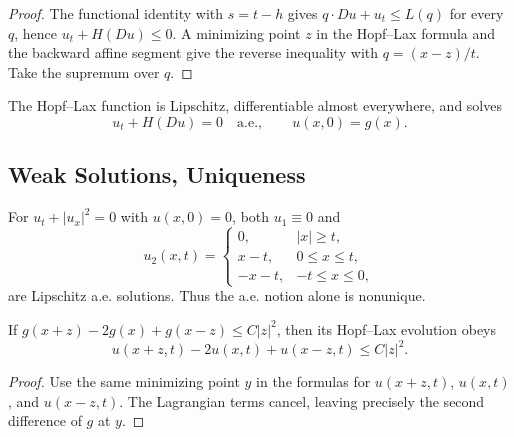 \begin{proof}
\sketch The functional identity with $s=t-h$ gives
$q\cdot Du+u_t\le L(q)$ for every $q$, hence
$u_t+H(Du)\le0$. A minimizing point $z$ in the Hopf--Lax formula and the
backward affine segment give the reverse inequality with
$q=(x-z)/t$. Take the supremum over $q$.
\end{proof}

\begin{theorem}
\label{thm:hopf-lax-formula-as-solution}

The Hopf--Lax function is Lipschitz, differentiable almost everywhere, and
solves
\[
u_t+H(Du)=0\quad\text{a.e.},\qquad u(x,0)=g(x).
\]
\end{theorem}

\subsection{Weak Solutions, Uniqueness}
\label{sec:hj-weak-solutions-uniqueness}

\begin{example}
\label{ex:nonuniqueness-weak-solutions-hj}
For $u_t+|u_x|^2=0$ with $u(x,0)=0$, both $u_1\equiv0$ and
\[
u_2(x,t)=
\begin{cases}0,&|x|\ge t,\\x-t,&0\le x\le t,\\-x-t,&-t\le x\le0,
\end{cases}
\]
are Lipschitz a.e. solutions. Thus the a.e. notion alone is nonunique.
\end{example}

\begin{lemma}[Semiconcavity]
\label{lem:hopf-lax-semiconcavity-from-data}

If $g(x+z)-2g(x)+g(x-z)\le C|z|^2$, then its Hopf--Lax evolution obeys
\[
u(x+z,t)-2u(x,t)+u(x-z,t)\le C|z|^2.
\]
\end{lemma}

\begin{proof}
\sketch Use the same minimizing point $y$ in the formulas for $u(x+z,t)$,
$u(x,t)$, and $u(x-z,t)$. The Lagrangian terms cancel, leaving precisely the
second difference of $g$ at $y$.
\end{proof}

